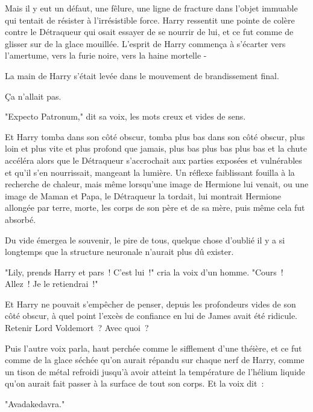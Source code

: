 Mais il y eut un défaut, une fêlure, une ligne de fracture dans l'objet immuable qui tentait de résister à l'irrésistible force. Harry ressentit une pointe de colère contre le Détraqueur qui osait essayer de se nourrir de lui, et ce fut comme de glisser sur de la glace mouillée. L'esprit de Harry commença à s'écarter vers l'amertume, vers la furie noire, vers la haine mortelle -

La main de Harry s'était levée dans le mouvement de brandissement final.

Ça n'allait pas.

"Expecto Patronum," dit sa voix, les mots creux et vides de sens.

Et Harry tomba dans son côté obscur, tomba plus bas dans son côté obscur, plus loin et plus vite et plus profond que jamais, plus bas plus bas plus bas et la chute accéléra alors que le Détraqueur s'accrochait aux parties exposées et vulnérables et qu'il s'en nourrissait, mangeant la lumière. Un réflexe faiblissant fouilla à la recherche de chaleur, mais même lorsqu'une image de Hermione lui venait, ou une image de Maman et Papa, le Détraqueur la tordait, lui montrait Hermione allongée par terre, morte, les corps de son père et de sa mère, puis même cela fut absorbé.

Du vide émergea le souvenir, le pire de tous, quelque chose d'oublié il y a si longtemps que la structure neuronale n'aurait plus dû exister.
\begin{em}
"Lily, prends Harry et pars~! C'est lui~!" cria la voix d'un homme. "Cours~! Allez~! Je le retiendrai~!"

Et Harry ne pouvait s'empêcher de penser, depuis les profondeurs vides de son côté obscur, à quel point l'excès de confiance en lui de James avait été ridicule. Retenir Lord Voldemort~? Avec quoi~?

Puis l'autre voix parla, haut perchée comme le sifflement d'une théière, et ce fut comme de la glace séchée qu'on aurait répandu sur chaque nerf de Harry, comme un tison de métal refroidi jusqu'à avoir atteint la température de l'hélium liquide qu'on aurait fait passer à la surface de tout son corps. Et la voix dit~:

"Avadakedavra."
\end{em}

